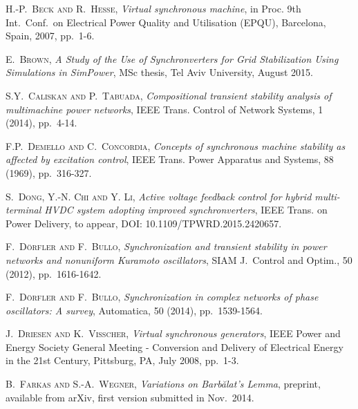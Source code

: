 \documentclass[12pt]{article}
\theoremstyle{definition}
\numberwithin{equation}{section}                        %
\newcommand{\m}      {{\hbox{\hskip 1pt}}}
\begin{document}
\begin{thebibliography}{99}{\small


 \textsc{H.-P.~Beck and R.~Hesse,} \m {\em Virtual synchronous machine},
 in Proc. 9th Int.~Conf.~on Electrical Power Quality and Utilisation
 (EPQU), Barcelona, Spain, 2007, pp.~1-6.

 \textsc{E.~Brown,} \m {\em A Study of the Use of Synchronverters for
 Grid Stabilization Using Simulations in SimPower}, \m MSc thesis, Tel
 Aviv University, August 2015.

 \textsc{S.Y.~Caliskan and P.~Tabuada,} \m {\em Compositional transient
 stability analysis of multimachine power networks}, IEEE Trans. Control
 of Network Systems, 1 (2014), pp.~4-14.

 \textsc{F.P.~Demello and C.~Concordia,} \m {\em Concepts of synchronous
 machine stability as affected by excitation control}, IEEE Trans. Power
 Apparatus and Systems, 88 (1969), pp.~316-327.

 \textsc{S.~Dong, Y.-N. Chi and Y. Li,} \m {\em Active voltage feedback
 control for hybrid multi-terminal HVDC system adopting improved
 synchronverters}, IEEE Trans. on Power Delivery, to appear,
 DOI: 10.1109/TPWRD.2015.2420657.

 \textsc{F.~D\"orfler and F.~Bullo,} \m {\em Synchronization and
 transient stability in power networks and nonuniform Kuramoto
 oscillators}, SIAM J.~Control and Optim., 50 (2012),
 pp.~1616-1642.

 \textsc{F.~D\"orfler and F.~Bullo,} \m {\em Synchronization in complex
 networks of phase oscillators: A survey}, Automatica, 50 (2014),
 pp.~1539-1564.

 \textsc{J.~Driesen and K.~Visscher,} \m {\em Virtual synchronous
 generators}, IEEE Power and Energy Society General Meeting - Conversion
 and Delivery of Electrical Energy in the 21st Century, Pittsburg, PA,
 July 2008, pp.~1-3.

 \textsc{B.~Farkas and S.-A.~Wegner,} \m {\em Variations on
 Barb\u alat's Lemma}, preprint, available from arXiv, first version
 submitted in Nov.~2014.

}
\end{thebibliography}
\end{document}
